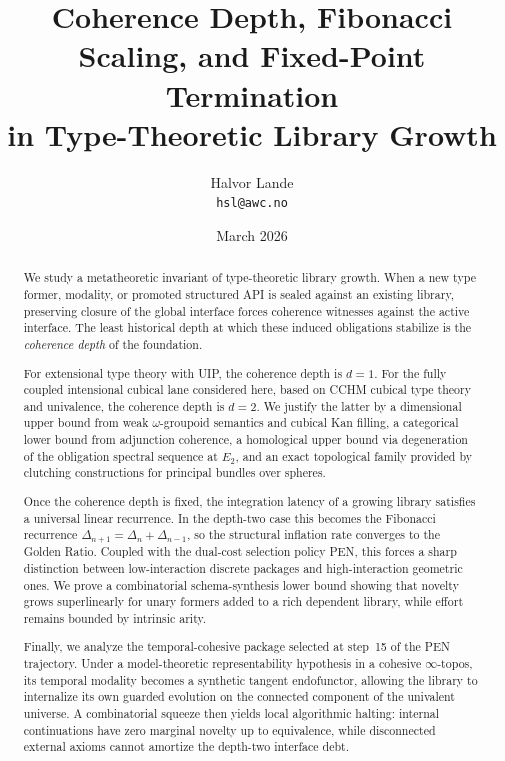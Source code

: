\documentclass[11pt,a4paper]{article}
\title{\textbf{Coherence Depth, Fibonacci Scaling, and Fixed-Point Termination\\
in Type-Theoretic Library Growth}}
\author{Halvor Lande\\
\texttt{hsl@awc.no}}
\date{March 2026}
\theoremstyle{plain}
\theoremstyle{definition}
\theoremstyle{remark}
\begin{document}
\maketitle

\begin{abstract}
We study a metatheoretic invariant of type-theoretic library growth.  When a new type former, modality, or promoted structured API is sealed against an existing library, preserving closure of the global interface forces coherence witnesses against the active interface.  The least historical depth at which these induced obligations stabilize is the \emph{coherence depth} of the foundation.

For extensional type theory with UIP, the coherence depth is $d=1$.  For the fully coupled intensional cubical lane considered here, based on CCHM cubical type theory and univalence, the coherence depth is $d=2$.  We justify the latter by a dimensional upper bound from weak $\omega$-groupoid semantics and cubical Kan filling, a categorical lower bound from adjunction coherence, a homological upper bound via degeneration of the obligation spectral sequence at $E_2$, and an exact topological family provided by clutching constructions for principal bundles over spheres.

Once the coherence depth is fixed, the integration latency of a growing library satisfies a universal linear recurrence.  In the depth-two case this becomes the Fibonacci recurrence $\Delta_{n+1}=\Delta_n+\Delta_{n-1}$, so the structural inflation rate converges to the Golden Ratio.  Coupled with the dual-cost selection policy PEN, this forces a sharp distinction between low-interaction discrete packages and high-interaction geometric ones.  We prove a combinatorial schema-synthesis lower bound showing that novelty grows superlinearly for unary formers added to a rich dependent library, while effort remains bounded by intrinsic arity.

Finally, we analyze the temporal-cohesive package selected at step~15 of the PEN trajectory.  Under a model-theoretic representability hypothesis in a cohesive $\infty$-topos, its temporal modality becomes a synthetic tangent endofunctor, allowing the library to internalize its own guarded evolution on the connected component of the univalent universe.  A combinatorial squeeze then yields local algorithmic halting: internal continuations have zero marginal novelty up to equivalence, while disconnected external axioms cannot amortize the depth-two interface debt.
\end{abstract}
\end{document}
